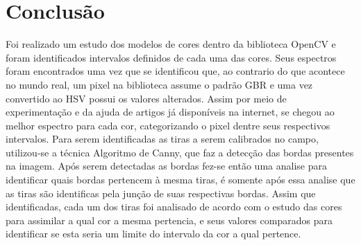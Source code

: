 
\chapter{Conclusão} \label{Cap:Conclusao}


	Foi realizado um estudo dos modelos de cores dentro da biblioteca OpenCV e foram identificados intervalos definidos de cada uma das cores. Seus espectros foram encontrados uma vez que se identificou que, ao contrario do que acontece no mundo real, um pixel na biblioteca assume o  padrão GBR e uma vez convertido ao HSV possui os valores alterados. Assim por meio de experimentação e da ajuda de artigos já disponíveis na internet, se chegou ao melhor espectro para cada cor, categorizando o pixel dentre seus respectivos intervalos. Para serem identificadas as tiras a serem calibrados no campo, utilizou-se a técnica Algoritmo de Canny, que faz a detecção das bordas presentes na imagem. Após serem detectadas as bordas fez-se então uma analise para identificar quais bordas pertencem à mesma tiras, é somente após essa analise que as tiras são identificas pela junção de suas respectivas bordas. Assim que identificadas, cada um dos tiras foi analisado de acordo com o estudo das cores para assimilar a qual cor a mesma pertencia, e seus valores comparados para identificar se esta seria um limite do intervalo da cor a qual pertence.

